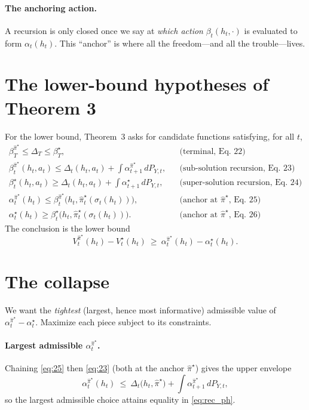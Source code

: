 \documentclass[11pt]{article}
\newcommand{\pihat}{\hat\pi}
\newcommand{\PY}{P_{Y,t}}
\theoremstyle{definition}
\begin{document}
\paragraph{The anchoring action.} A recursion is only closed once we say at
\emph{which action} $\beta_t(h_t,\cdot)$ is evaluated to form $\alpha_t(h_t)$. This
``anchor'' is where all the freedom---and all the trouble---lives.

\section{The lower-bound hypotheses of Theorem 3}
For the lower bound, Theorem~3 asks for candidate functions satisfying, for all
$t$,
\begin{align}
\beta^{\pihat^\star}_T \le \Delta_T \le \beta^\star_T, &&\text{(terminal, Eq.~22)}\label{eq:T}\\
\beta^{\pihat^\star}_t(h_t,a_t) \le \Delta_t(h_t,a_t)+\int \alpha^{\pihat^\star}_{t+1}\,d\PY,
&&\text{(sub-solution recursion, Eq.~23)}\label{eq:23}\\
\beta^{\star}_t(h_t,a_t) \ge \Delta_t(h_t,a_t)+\int \alpha^{\star}_{t+1}\,d\PY,
&&\text{(super-solution recursion, Eq.~24)}\label{eq:24}\\
\alpha^{\pihat^\star}_t(h_t) \le \beta^{\pihat^\star}_t\bigl(h_t,\pihat^\star_t(\sigma_t(h_t))\bigr),
&&\text{(anchor at $\pihat^\star$, Eq.~25)}\label{eq:25}\\
\alpha^{\star}_t(h_t) \ge \beta^{\star}_t\bigl(h_t,\pihat^\star_t(\sigma_t(h_t))\bigr).
&&\text{(anchor at $\pihat^\star$, Eq.~26)}\label{eq:26}
\end{align}
The conclusion is the lower bound
\begin{equation}
V^{\pihat^\star}_t(h_t)-V^\star_t(h_t)\ \ge\ \alpha^{\pihat^\star}_t(h_t)-\alpha^{\star}_t(h_t).
\tag{27}\label{eq:27}
\end{equation}

\section{The collapse}
We want the \emph{tightest} (largest, hence most informative) admissible value of
$\alpha^{\pihat^\star}_t-\alpha^\star_t$. Maximize each piece subject to its
constraints.

\paragraph{Largest admissible $\alpha^{\pihat^\star}_t$.} Chaining \eqref{eq:25}
then \eqref{eq:23} (both at the anchor $\pihat^\star$) gives the upper envelope
\begin{equation}
\alpha^{\pihat^\star}_t(h_t)\ \le\ \Delta_t\bigl(h_t,\pihat^\star\bigr)+\int \alpha^{\pihat^\star}_{t+1}\,d\PY,
\label{eq:rec_ph}
\end{equation}
so the largest admissible choice attains equality in \eqref{eq:rec_ph}.
\end{document}
